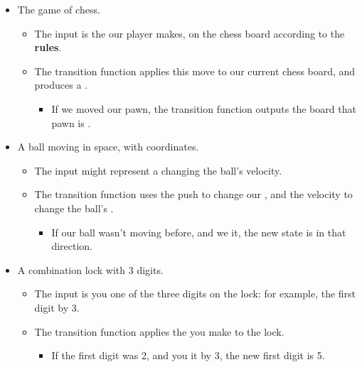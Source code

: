         \begin{itemize}
            \item The game of chess.
                \begin{itemize}
                    \item The input  is the  our player makes,  on the chess board according to the \textbf{rules}.
                    
                    \item The transition function  applies this move to our current chess board, and produces a .
                        \begin{itemize}
                            \item If we moved our pawn, the transition function outputs the board  that pawn is .
                        \end{itemize}
                \end{itemize}
                
            \item A ball moving in space, with coordinates.
                \begin{itemize}
                    \item The input  might represent a  changing the ball's velocity.
                    
                    \item The transition function  uses the push to change our , and the velocity to change the ball's .
                        \begin{itemize}
                            \item If our ball wasn't moving before, and we  it, the new state is  in that direction.
                        \end{itemize}
                \end{itemize}
                
            \item A combination lock with 3 digits.
                \begin{itemize}
                    \item The input  is you  one of the three digits on the lock: for example,  the first digit by 3.
                    
                    \item The transition function  applies the  you make to the lock.
                        \begin{itemize}
                            \item If the first digit was 2, and you  it by 3, the new first digit is 5.
                        \end{itemize}
                \end{itemize}
        \end{itemize}




